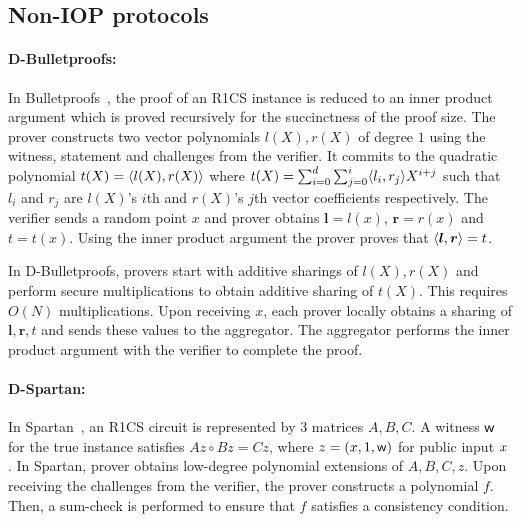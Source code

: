\subsection{Non-IOP protocols}
\paragraph*{D-Bulletproofs:}
In Bulletproofs~\cite{bulletproofs}, the proof of an R1CS instance is reduced to an inner product argument which is proved recursively for the succinctness of the proof size. 
The prover constructs two vector polynomials $l(X), r(X)$ of degree $1$ using the witness, statement and challenges from the verifier. It commits to the quadratic polynomial $t(X) = \langle l(X),r(X)\rangle$ where $t(X) = \sum_{i=0}^{d} \sum_{j=0}^{i} \langle l_i,r_j\rangle X^{i+j}$ such that $l_i$ and $r_j$ are $l(X)$'s $i$th and $r(X)$'s $j$th vector coefficients respectively.
The verifier sends a random point $x$ and prover obtains ${\bm l} = l(x)$, ${\bm r} = r(x)$ and $t = t(x)$. Using the inner product argument the prover proves that $\langle {\bm l},{\bm r}\rangle = t$.

In D-Bulletproofs, provers start with additive sharings of $l(X), r(X)$ and perform secure multiplications to obtain additive sharing of $t(X)$. This requires $O(N)$ multiplications. Upon receiving $x$, each prover locally obtains a sharing of ${\bm l,\bm r}, t$ and sends these values to the aggregator. The aggregator performs the inner product argument with the verifier to complete the proof.
%
\vspace*{-.3cm}
\paragraph*{D-Spartan:}
In Spartan~\cite{spartan}, an R1CS circuit is represented by 3 matrices $A, B, C$. A witness $\mathsf{w}$ for the true instance satisfies $Az  \circ Bz = Cz$, where $z = ({x}, 1, \mathsf{w})$ for public input ${x}$. In Spartan, prover obtains low-degree polynomial extensions of $A, B, C, z$. Upon receiving the challenges from the verifier, the prover constructs a polynomial $f$. %
Then, a sum-check is performed to ensure that $f$ satisfies a consistency condition.

